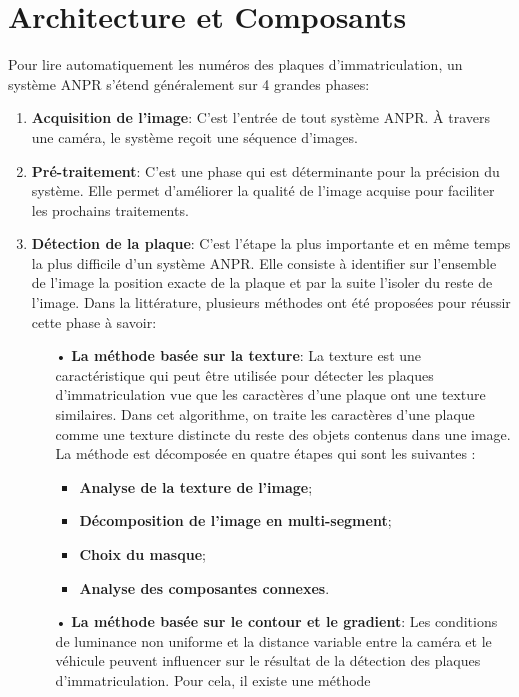 \section{Architecture et Composants}
Pour lire automatiquement les numéros des plaques d’immatriculation, un système ANPR s’étend généralement sur 4 grandes phases:
\begin{enumerate}
    \item \textbf{Acquisition de l’image}: C’est l’entrée de tout système ANPR. À travers une caméra, le système reçoit une séquence d’images.
    \item \textbf{Pré-traitement}: C’est une phase qui est déterminante pour la précision du système. Elle permet d’améliorer la qualité de l’image acquise pour faciliter les prochains traitements.
    \item \textbf{Détection de la plaque}: C’est l’étape la plus importante et en même temps la plus difficile d’un système ANPR. Elle consiste à identifier sur l’ensemble de l’image la position exacte de la plaque et par la suite l’isoler du reste de l’image. Dans la littérature, plusieurs méthodes ont été proposées pour réussir cette phase à savoir:
        \begin{itemize}
            \item[•] \textbf{La méthode basée sur la texture}: La texture est une caractéristique qui peut être utilisée pour détecter les plaques d’immatriculation vue
            que les caractères d’une plaque ont une texture similaires. Dans cet algorithme, on traite les caractères
            d’une plaque comme une texture distincte du reste des objets contenus dans une image. La méthode est
            décomposée en quatre étapes qui sont les suivantes :
                \begin{itemize}
                    \item \textbf{Analyse de la texture de l’image};
                    \item \textbf{Décomposition de l’image en multi-segment};
                    \item \textbf{Choix du masque};
                    \item \textbf{Analyse des composantes connexes}.
                \end{itemize}
            \item[•] \textbf{La méthode basée sur le contour et le gradient}: Les conditions de luminance non uniforme et la distance variable entre la caméra et le véhicule peuvent
            influencer sur le résultat de la détection des plaques d’immatriculation. Pour cela, il existe une méthode

\end{itemize}
\end{enumerate}
